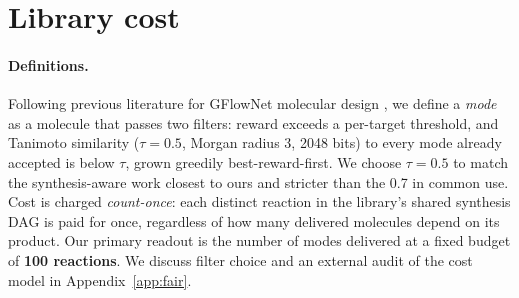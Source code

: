 \documentclass{article}
\newcommand{\pending}[1]{\textcolor{red}{[\,#1\,]}}
\begin{document}
%

\section{Library cost}
\label{sec:metric}

\paragraph{Definitions.}
Following previous literature for GFlowNet molecular design
\citep{bengio2021flow,zhang2023quantileflows,lau2024qgfn,shen2025cgflow}, we define a \emph{mode} as a molecule that passes two filters: reward exceeds a per-target threshold, and Tanimoto similarity ($\tau = 0.5$, Morgan radius 3, 2048 bits) to every mode already accepted is below $\tau$, grown greedily best-reward-first. We choose $\tau = 0.5$ to match the synthesis-aware work closest to ours \citep{shen2025cgflow} and stricter than the 0.7 in common use. Cost is charged \emph{count-once}: each distinct reaction in the library's shared synthesis DAG is paid for once, regardless of how many delivered molecules depend on its product. Our primary readout is the number of modes delivered at a fixed budget of \textbf{100 reactions}. We discuss filter choice and an external audit of the cost model in Appendix~\ref{app:fair}.
\end{document}
